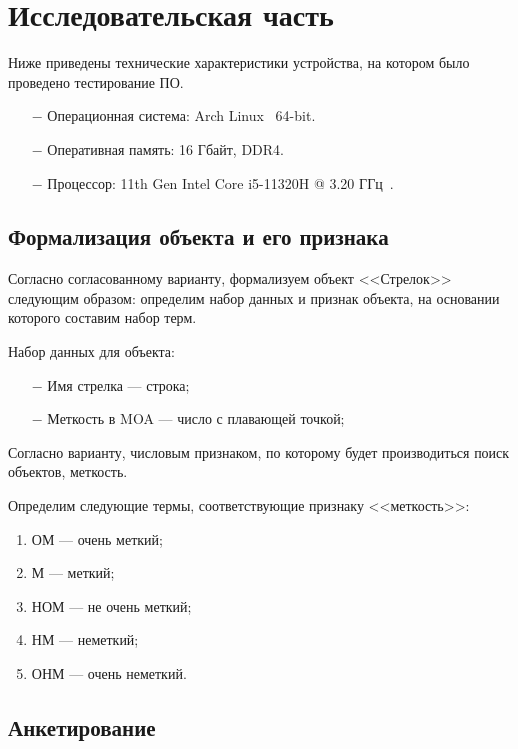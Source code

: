 \chapter{Исследовательская часть}

Ниже приведены технические характеристики устройства, на котором было проведено тестирование ПО.

\begin{itemize}
    \item[$-$] Операционная система: Arch Linux~\cite{arch} 64-bit.
    \item[$-$] Оперативная память: 16 Гбайт, DDR4.
    \item[$-$] Процессор: 11th Gen Intel\textsuperscript{\tiny\textregistered} Core\textsuperscript{\tiny\texttrademark} i5-11320H @ 3.20 ГГц~\cite{i5}. 
\end{itemize}

\section{Формализация объекта и его признака}\label{formal}

Согласно согласованному варианту, формализуем объект <<Стрелок>> следующим образом: 
определим набор данных и признак объекта, на основании которого составим набор терм.

Набор данных для объекта:
\begin{itemize}
	\item[$-$] Имя стрелка --- строка;
	\item[$-$] Меткость в MOA --- число с плавающей точкой;
\end{itemize}

Согласно варианту, числовым признаком, по которому будет производиться поиск объектов, меткость. 

Определим следующие термы, соответствующие признаку <<меткость>>:
\begin{enumerate}[ 1{)}] 
    \item ОМ --- очень меткий;
    \item М --- меткий;
    \item НОМ --- не очень меткий; 
    \item НМ --- неметкий; 
    \item ОНМ --- очень неметкий. 
\end{enumerate}

\clearpage

\section{Анкетирование}

